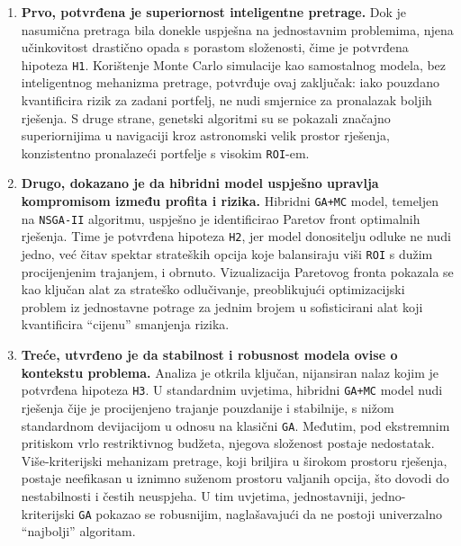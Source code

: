 \begin{enumerate}
    \item \textbf{Prvo, potvrđena je superiornost inteligentne pretrage.} Dok je nasumična pretraga bila donekle uspješna na jednostavnim problemima, njena učinkovitost drastično opada s porastom složenosti, čime je potvrđena hipoteza \texttt{H1}. Korištenje Monte Carlo simulacije kao samostalnog modela, bez inteligentnog mehanizma pretrage, potvrđuje ovaj zaključak: iako pouzdano kvantificira rizik za zadani portfelj, ne nudi smjernice za pronalazak boljih rješenja. S druge strane, genetski algoritmi su se pokazali značajno superiornijima u navigaciji kroz astronomski velik prostor rješenja, konzistentno pronalazeći portfelje s visokim \texttt{ROI}-em.
    \item \textbf{Drugo, dokazano je da hibridni model uspješno upravlja kompromisom između profita i rizika.} Hibridni \texttt{GA+MC} model, temeljen na \texttt{NSGA-II} algoritmu, uspješno je identificirao Paretov front optimalnih rješenja. Time je potvrđena hipoteza \texttt{H2}, jer model donositelju odluke ne nudi jedno, već čitav spektar strateških opcija koje balansiraju viši \texttt{ROI} s dužim procijenjenim trajanjem, i obrnuto. Vizualizacija Paretovog fronta pokazala se kao ključan alat za strateško odlučivanje, preoblikujući optimizacijski problem iz jednostavne potrage za jednim brojem u sofisticirani alat koji kvantificira ``cijenu'' smanjenja rizika.
    \item \textbf{Treće, utvrđeno je da stabilnost i robusnost modela ovise o kontekstu problema.} Analiza je otkrila ključan, nijansiran nalaz kojim je potvrđena hipoteza \texttt{H3}. U standardnim uvjetima, hibridni \texttt{GA+MC} model nudi rješenja čije je procijenjeno trajanje pouzdanije i stabilnije, s nižom standardnom devijacijom u odnosu na klasični \texttt{GA}. Međutim, pod ekstremnim pritiskom vrlo restriktivnog budžeta, njegova složenost postaje nedostatak. Više-kriterijski mehanizam pretrage, koji briljira u širokom prostoru rješenja, postaje neefikasan u iznimno suženom prostoru valjanih opcija, što dovodi do nestabilnosti i čestih neuspjeha. U tim uvjetima, jednostavniji, jedno-kriterijski \texttt{GA} pokazao se robusnijim, naglašavajući da ne postoji univerzalno ``najbolji'' algoritam.
\end{enumerate}

